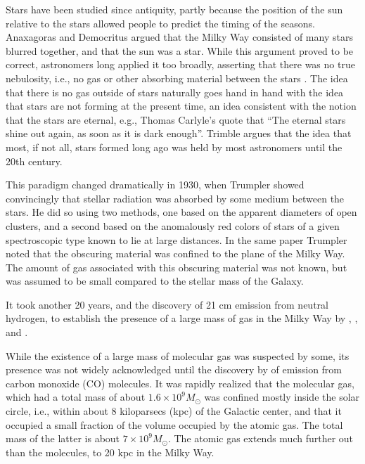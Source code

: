 \documentclass[../dissertation.tex]{subfiles}
\begin{document}
Stars have been studied since antiquity, partly because the position of the sun relative to the stars allowed people to predict the timing of the seasons. 
Anaxagoras and Democritus argued that the Milky Way consisted of many stars blurred together, and that the sun was a star. 
While this argument proved to be correct, astronomers long applied it too broadly, asserting that 
there was no true nebulosity, i.e., no gas or other absorbing material between the stars \citep{1997AIPC..393...15T}. 
The idea that there is no gas outside of stars naturally goes hand in hand with the idea that stars are not forming at the present time, 
an idea consistent with the notion that the stars are eternal, e.g., Thomas Carlyle's quote that ``The eternal stars shine out again, as soon as it is dark enough''. 
Trimble argues that the idea that most, if not all, stars formed long ago was held by most astronomers until the 20th century. 

This paradigm changed dramatically in 1930, when Trumpler \citep{1930LicOB..14..154T} showed convincingly that stellar radiation was absorbed by some medium between the stars. 
He did so using two methods, one based on the apparent diameters of open clusters, 
and a second based on the anomalously red colors of stars of a given spectroscopic type known to lie at large distances. 
In the same paper Trumpler noted that the obscuring material was confined to the plane of the Milky Way. 
The amount of gas associated with this obscuring material was not known, but was assumed to be small compared to the stellar mass of the Galaxy.

It took another 20 years, and the discovery of 21 cm emission from neutral hydrogen, to establish the presence of a 
large mass of gas in the Milky Way by \citet{1951Natur.168..356E}, \citet{1951Natur.168..357M}, and \citet{1951Natur.168..358P}.

While the existence of a large mass of molecular gas was suspected by some, 
its presence was not widely acknowledged until the discovery by \citet{1970ApJ...161L..43W}
of emission from carbon monoxide (CO) molecules. 
It was rapidly realized that the molecular gas, which had a total mass of about $1.6\times10^9M_\odot$ \citep{1993AIPC..278..267D,2017ApJ...834...57M} 
was confined mostly inside the solar circle, i.e., within about 8 kiloparsecs (kpc) of the Galactic center, 
and that it occupied a small fraction of the volume occupied by the atomic gas. 
The total mass of the latter is about $7\times10^9M_\odot$. 
The atomic gas extends much further out than the molecules, to 20 kpc in the Milky Way. 
\end{document}
